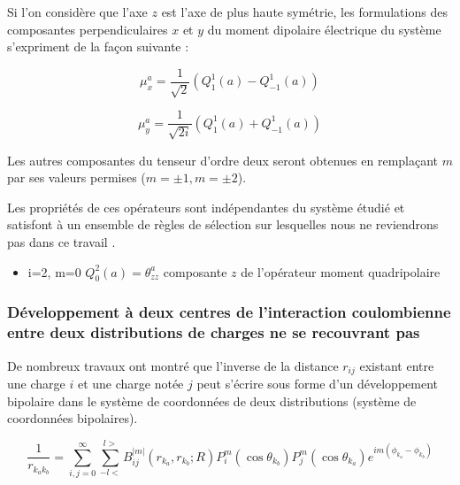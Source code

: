 	Si l'on considère que l'axe $z$ est l'axe de plus haute symétrie, les formulations des composantes perpendiculaires $x$ et $y$ du moment dipolaire électrique du système s'expriment de la façon suivante : 
	
	\begin{equation}
	\mu_{x}^{a} = \frac{1}{\sqrt{2}} (Q_{1}^{1}(a)- Q_{-1}^{1}(a))
	\end{equation}
	
	\begin{equation}
	\mu_{y}^{a} = \frac{1}{\sqrt{2i}} (Q_{1}^{1}(a)+ Q_{-1}^{1}(a))
	\end{equation}
	
	Les autres composantes du tenseur d'ordre deux seront obtenues en remplaçant $m$ par ses valeurs permises ($m=\pm 1, m=\pm 2$).
	
	Les propriétés de ces opérateurs sont indépendantes du système étudié et satisfont à un ensemble de règles de sélection sur lesquelles nous ne reviendrons pas dans ce travail \cite{hall2015lie}. 
	
	\begin{itemize}
		\item i=2, m=0 \hspace{1cm} $Q_{0}^{2}(a) = \theta_{zz}^{a}$ \hspace{1cm} composante $z$ de l'opérateur moment quadripolaire 
	\end{itemize}
	
	\subsubsection{Développement à deux centres de l'interaction coulombienne entre deux distributions de charges ne se recouvrant pas}
	
	De nombreux travaux \cite{buehler1951bipolar,hylleraas1931elektronenterme,proctor1977long,davison1968atomic} ont montré que l'inverse de la distance $r_{ij}$ existant entre une charge $i$ et une charge notée $j$ peut s'écrire sous forme d'un développement bipolaire dans le système de coordonnées de deux distributions (système de coordonnées bipolaires).
	
	\begin{equation}
	\frac{1}{r_{k_{a}k_{b}}} = \sum_{i,j=0}^{\infty} \sum_{-l<}^{l>} B_{ij}^{|m|}(r_{k_{a}}, r_{k_{b}}; R) P_{i}^{m} (\cos\theta_{k_{b}}) P_{j}^{m}(\cos\theta_{k_{a}}) e^{im(\phi_{k_{a}}-\phi_{k_{b}})}
	\end{equation}
	
